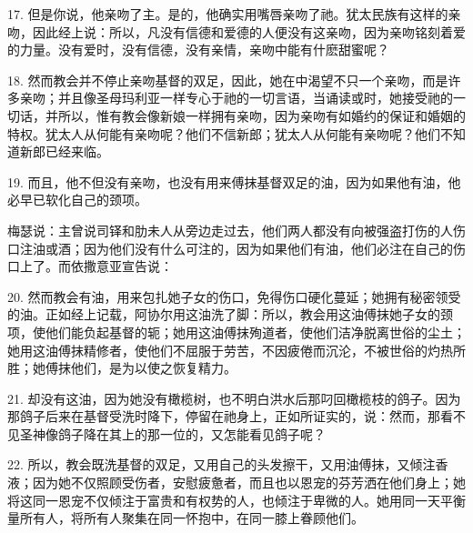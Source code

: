 17. 但是你说，他亲吻了主。是的，他确实用嘴唇亲吻了祂。犹太民族有这样的亲吻，因此经上说：所以，凡没有信德和爱德的人便没有这亲吻，因为亲吻铭刻着爱的力量。没有爱时，没有信德，没有亲情，亲吻中能有什麽甜蜜呢？\par

18. 然而教会并不停止亲吻基督的双足，因此，她在中渴望不只一个亲吻，而是许多亲吻；并且像圣母玛利亚一样专心于祂的一切言语，当诵读或时，她接受祂的一切话，并所以，惟有教会像新娘一样拥有亲吻，因为亲吻有如婚约的保证和婚姻的特权。犹太人从何能有亲吻呢？他们不信新郎；犹太人从何能有亲吻呢？他们不知道新郎已经来临。\par

19. 而且，他不但没有亲吻，也没有用来傅抹基督双足的油，因为如果他有油，他必早已软化自己的颈项。\par

梅瑟说：主曾说司铎和肋未人从旁边走过去，他们两人都没有向被强盗打伤的人伤口注油或酒；因为他们没有什么可注的，因为如果他们有油，他们必注在自己的伤口上了。而依撒意亚宣告说：\par

20. 然而教会有油，用来包扎她子女的伤口，免得伤口硬化蔓延；她拥有秘密领受的油。正如经上记载，阿协尔用这油洗了脚：所以，教会用这油傅抹她子女的颈项，使他们能负起基督的轭；她用这油傅抹殉道者，使他们洁净脱离世俗的尘土；她用这油傅抹精修者，使他们不屈服于劳苦，不因疲倦而沉沦，不被世俗的灼热所胜；她傅抹他们，是为以使之恢复精力。\par

21. 却没有这油，因为她没有橄榄树，也不明白洪水后那叼回橄榄枝的鸽子。因为那鸽子后来在基督受洗时降下，停留在祂身上，正如所证实的，说：然而，那看不见圣神像鸽子降在其上的那一位的，又怎能看见鸽子呢？\par

22. 所以，教会既洗基督的双足，又用自己的头发擦干，又用油傅抹，又倾注香液；因为她不仅照顾受伤者，安慰疲惫者，而且也以恩宠的芬芳洒在他们身上；她将这同一恩宠不仅倾注于富贵和有权势的人，也倾注于卑微的人。她用同一天平衡量所有人，将所有人聚集在同一怀抱中，在同一膝上眷顾他们。\par

